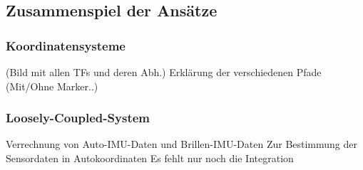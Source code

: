\subsection{Zusammenspiel der Ansätze}
\subsubsection{Koordinatensysteme}
(Bild mit allen TFs und deren Abh.) Erklärung der verschiedenen Pfade (Mit/Ohne Marker..)
\subsubsection{Loosely-Coupled-System}
Verrechnung von Auto-IMU-Daten und Brillen-IMU-Daten Zur Bestimmung der Sensordaten in Autokoordinaten Es fehlt nur noch die Integration